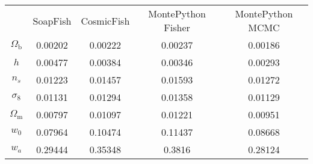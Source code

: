 \begin{table}
\centering
\begin{tabular}{|c|c|c|c|c|}
 & SoapFish & CosmicFish & MontePython Fisher & MontePython MCMC \\
$\Omega_\mathrm{b}$ & 0.00202 & 0.00222 & 0.00237 & 0.00186 \\
$h$ & 0.00477 & 0.00384 & 0.00346 & 0.00293 \\
$n_s$ & 0.01223 & 0.01457 & 0.01593 & 0.01272 \\
$\sigma_8$ & 0.01131 & 0.01294 & 0.01358 & 0.01129 \\
$\Omega_\mathrm{m}$ & 0.00797 & 0.01097 & 0.01221 & 0.00951 \\
$w_0$ & 0.07964 & 0.10474 & 0.11437 & 0.08668 \\
$w_a$ & 0.29444 & 0.35348 & 0.3816 & 0.28124 \\
\end{tabular}
\end{table}
